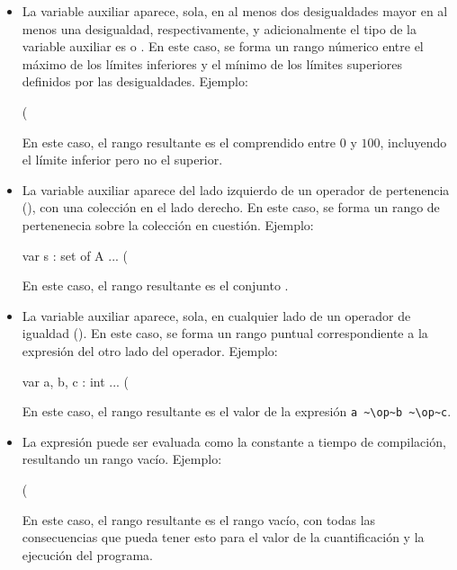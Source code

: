 \begin{itemize}

  \item La variable auxiliar aparece, sola, en al menos dos desigualdades
  mayor en al menos una desigualdad, respectivamente, y adicionalmente el tipo
  de la variable auxiliar es  o . En este caso, se
  forma un rango númerico entre el máximo de los límites inferiores y el mínimo
  de los límites superiores definidos por las desigualdades. Ejemplo:

\begin{gracielacode}
(%
\end{gracielacode}

  En este caso, el rango resultante es el comprendido entre $0$ y $100$,
  incluyendo  el límite inferior pero no el superior.\\

  \item La variable auxiliar aparece del lado izquierdo de un operador de
  pertenencia (\Elem), con una colección en el lado derecho. En este caso, se
  forma un rango de pertenenecia sobre la colección en cuestión. Ejemplo:

\begin{gracielacode}
var s : set of A
...
(%
\end{gracielacode}

  En este caso, el rango resultante es el conjunto .\\

  \item La variable auxiliar aparece, sola, en cualquier lado de un operador de
  igualdad (\ingra{==}). En este caso, se forma un rango puntual
  correspondiente a la expresión del otro lado del operador. Ejemplo:

\begin{gracielacode}
var a, b, c : int
...
(%
\end{gracielacode}

  En este caso, el rango resultante es el valor de la expresión
  \lstinline[language=graciela]{a ~\op~b ~\op~c}.\\

  \item La expresión puede ser evaluada como la constante  a
  tiempo de compilación, resultando un rango vacío. Ejemplo:

\begin{gracielacode}
(%
\end{gracielacode}

  En este caso, el rango resultante es el rango vacío, con todas las
  consecuencias que pueda tener esto para el valor de la cuantificación y la
  ejecución del programa.

\end{itemize}

